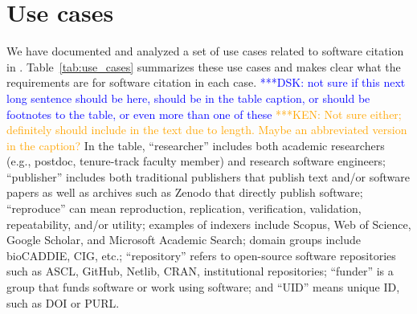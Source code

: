 \documentclass[11pt, oneside]{amsart}
\newcommand{\katznote}[1]{ {\textcolor{blue} { ***DSK: #1 }}}
\newcommand{\niemnote}[1]{ {\textcolor{orange} { ***KEN: #1 }}}
\begin{document}
\section{Use cases}
\label{sec:use_cases}

We have documented and analyzed a set of use cases related to software citation in \cite{SC-Use-Cases}.
Table~\ref{tab:use_cases} summarizes these use cases and makes clear what the requirements are for software citation in each case.
\katznote{not sure if this next long sentence should be here, should be in the table caption, or should be footnotes to the table, or even more than one of these}
\niemnote{Not sure either; definitely should include in the text due to length. Maybe an abbreviated version in the caption?}
In the table,
``researcher'' includes both academic researchers (e.g., postdoc, tenure-track faculty member) and research software engineers;
``publisher'' includes both traditional publishers that publish text and\slash or software papers as well as archives such as Zenodo that directly publish software;
``reproduce'' can mean reproduction, replication, verification, validation, repeatability, and\slash or utility;
examples of indexers include Scopus, Web of Science, Google Scholar, and Microsoft Academic Search;
domain groups include bioCADDIE, CIG, etc.;
``repository'' refers to open-source software repositories such as ASCL, GitHub, Netlib, CRAN, institutional repositories;
``funder'' is a group that funds software or work using software; and
``UID'' means unique ID, such as DOI or PURL.
\end{document}
